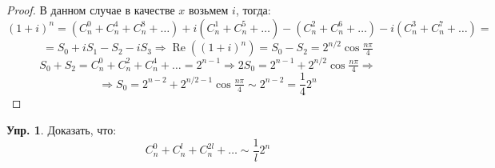 \documentclass[12pt]{article}
\theoremstyle{definition}
\newtheorem{exrc}{Упр.}
\DeclareMathOperator{\RE}{\operatorname{Re}}
\begin{document}
\begin{proof}
	В данном случае в качестве $x$ возьмем $i$, тогда:
	$$
		(1 + i)^n = (C_n^0 + C_n^4 + C_n^8 + \dotsc) + i(C_n^1  + C_n^5 + \dotsc ) - (C_n^2 + C_n^6 + \dotsc ) - i(C_n^3 + C_n^7 + \dotsc ) = 
	$$
	$$
		=S_0 + iS_1 - S_2  - iS_3 \Rightarrow \RE((1 + i)^n) = S_0 - S_2 = 2^{n/2}\cos\tfrac{n \pi}{4}
	$$
	$$
		S_0 + S_2 = C_n^0 +C_n^2 + C_n^4 + \dotsc = 2^{n-1} \Rightarrow 2S_0 = 2^{n-1} + 2^{n/2}\cos\tfrac{n \pi}{4} \Rightarrow 
	$$
	$$	
		\Rightarrow S_0 = 2^{n-2} + 2^{n/2 - 1}\cos\tfrac{n\pi}{4} \sim 2^{n-2} = \dfrac{1}{4}2^n
	$$
\end{proof}
\begin{exrc}
	Доказать, что:
	$$
		C_n^0 + C_n^l + C_n^{2l} + \dotsc \sim \dfrac{1}{l}2^n
	$$
\end{exrc}
\end{document}
